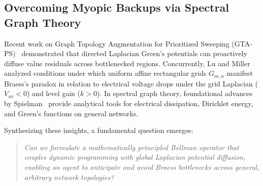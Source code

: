 \documentclass[11pt,a4paper]{article}
\begin{document}
\subsection{Overcoming Myopic Backups via Spectral Graph Theory}
Recent work on Graph Topology Augmentation for Prioritized Sweeping (GTA-PS)~\cite{gta_ps2025} demonstrated that directed Laplacian Green's potentials can proactively diffuse value residuals across bottlenecked regions. Concurrently, Lu and Miller~\cite{lu2026braess} analyzed conditions under which uniform affine rectangular grids $G_{m,n}$ manifest Braess's paradox in relation to electrical voltage drops under the grid Laplacian ($V_{uv} < 0$) and level gain ($k > 0$). In spectral graph theory, foundational advances by Spielman~\cite{spielman2025sagt} provide analytical tools for electrical dissipation, Dirichlet energy, and Green's functions on general networks.

Synthesizing these insights, a fundamental question emerges:
\begin{quote}
\textit{Can we formulate a mathematically principled Bellman operator that couples dynamic programming with global Laplacian potential diffusion, enabling an agent to anticipate and avoid Braess bottlenecks across general, arbitrary network topologies?}
\end{quote}
\end{document}
